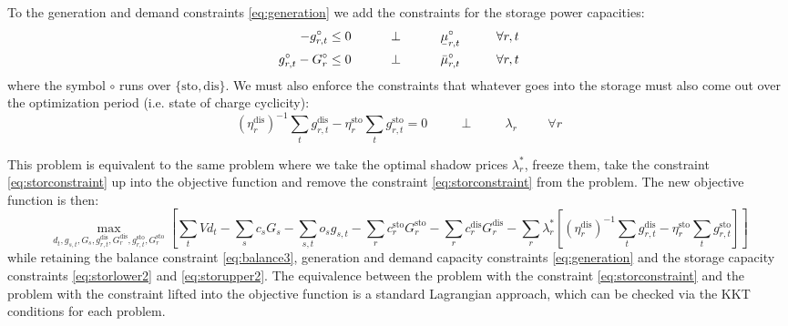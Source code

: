 \documentclass[final,3p]{elsarticle}
\begin{document}
To the generation and demand constraints \eqref{eq:generation} we add the
constraints for the storage power capacities:
\begin{align}
  -g^\circ_{r,t}\leq 0 \hspace{1cm}\perp \hspace{1cm} \ubar{\mu}^\circ_{r,t} \hspace{1cm} \forall r,t  \label{eq:storlower2} \\
  g^\circ_{r,t} - G^\circ_r \leq 0 \hspace{1cm}\perp \hspace{1cm} \bar{\mu}^\circ_{r,t} \hspace{1cm} \forall r,t \label{eq:storupper2}
\end{align}
where the symbol $\circ$ runs over $\{\textrm{sto},\textrm{dis}\}$.
We must also enforce the constraints that whatever goes into the storage must
also come out over the optimization period (i.e. state of charge cyclicity):
\begin{equation}
  (\eta_r^{\textrm{dis}})^{-1} \sum_t g^{\textrm{dis}}_{r,t} - \eta_r^{\textrm{sto}}  \sum_t g^{\textrm{sto}}_{r,t}  = 0  \hspace{1cm}\perp \hspace{1cm} \lambda_{r} \hspace{1cm} \forall r \label{eq:storconstraint}
\end{equation}

This problem is equivalent to the same problem where we take the optimal shadow
prices $\lambda^*_r$, freeze them, take the constraint \eqref{eq:storconstraint}
up into the objective function and remove the constraint
\eqref{eq:storconstraint} from the problem. The new objective function is then:
\begin{equation}
  \max_{d_{t}, g_{s,t}, G_s,g^{\textrm{dis}}_{r,t},G^{\textrm{dis}}_{r},g^{\textrm{sto}}_{r,t},G^{\textrm{sto}}_{r}}\left[\sum_{t} Vd_{t} -  \sum_s c_s G_s - \sum_{s,t} o_{s} g_{s,t} -\sum_r c^{\textrm{sto}}_r G^{\textrm{sto}}_r -\sum_r c^{\textrm{dis}}_r G^{\textrm{dis}}_r -\sum_r \lambda^*_r\left[ (\eta_r^{\textrm{dis}})^{-1} \sum_t g^{\textrm{dis}}_{r,t} - \eta_r^{\textrm{sto}}  \sum_t g^{\textrm{sto}}_{r,t}\right]  \right]  \label{eq:objst}
\end{equation}
while retaining the balance constraint \eqref{eq:balance3}, generation and demand
capacity constraints \eqref{eq:generation} and the storage capacity constraints
\eqref{eq:storlower2} and \eqref{eq:storupper2}.
The equivalence between the problem with the constraint
\eqref{eq:storconstraint} and the problem with the constraint lifted into the
objective function is a standard Lagrangian approach, which can be checked via the
KKT conditions for each problem.
\end{document}
